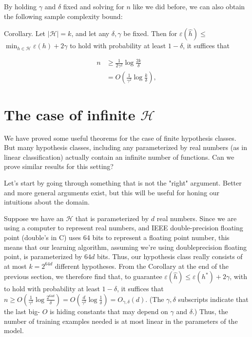 \documentclass[10pt]{article}
\begin{document}
By holding \(\gamma\) and \(\delta\) fixed and solving for \(n\) like we did before, we can also obtain the following sample complexity bound:

Corollary. Let \(|\mathcal{H}|=k\), and let any \(\delta, \gamma\) be fixed. Then for \(\varepsilon(\hat{h}) \leq\) \(\min _{h \in \mathcal{H}} \varepsilon(h)+2 \gamma\) to hold with probability at least \(1-\delta\), it suffices that

\[
\begin{aligned}
n & \geq \frac{1}{2 \gamma^{2}} \log \frac{2 k}{\delta} \\
& =O\left(\frac{1}{\gamma^{2}} \log \frac{k}{\delta}\right),
\end{aligned}
\]

\section{The case of infinite \(\mathcal{H}\)}
We have proved some useful theorems for the case of finite hypothesis classes. But many hypothesis classes, including any parameterized by real numbers (as in linear classification) actually contain an infinite number of functions. Can we prove similar results for this setting?

Let's start by going through something that is not the "right" argument. Better and more general arguments exist, but this will be useful for honing our intuitions about the domain.

Suppose we have an \(\mathcal{H}\) that is parameterized by \(d\) real numbers. Since we are using a computer to represent real numbers, and IEEE double-precision floating point (double's in C) uses 64 bits to represent a floating point number, this means that our learning algorithm, assuming we're using doubleprecision floating point, is parameterized by \(64 d\) bits. Thus, our hypothesis class really consists of at most \(k=2^{64 d}\) different hypotheses. From the Corollary at the end of the previous section, we therefore find that, to guarantee \(\varepsilon(\hat{h}) \leq \varepsilon\left(h^{*}\right)+2 \gamma\), with to hold with probability at least \(1-\delta\), it suffices that \(n \geq O\left(\frac{1}{\gamma^{2}} \log \frac{2^{64 d}}{\delta}\right)=O\left(\frac{d}{\gamma^{2}} \log \frac{1}{\delta}\right)=O_{\gamma, \delta}(d)\). (The \(\gamma, \delta\) subscripts indicate that the last big- \(O\) is hiding constants that may depend on \(\gamma\) and \(\delta\).) Thus, the number of training examples needed is at most linear in the parameters of the model.
\end{document}
